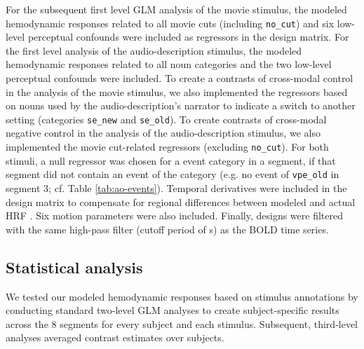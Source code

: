 \documentclass[english]{article}
\begin{document}
For the subsequent first level GLM analysis of the movie stimulus, the modeled
hemodynamic responses related to all movie cuts (including \texttt{no\_cut}) and
six low-level perceptual confounds were included as regressors in the design
matrix.
For the first level analysis of the audio-description stimulus, the modeled
hemodynamic responses related to all noun categories and the two low-level
perceptual confounds were included.
To create a contrasts of cross-modal control in the analysis of the movie
stimulus, we also implemented the regressors based on nouns used by the
audio-description's narrator to indicate a switch to another setting (categories
\texttt{se\_new} and \texttt{se\_old}).
To create contrasts of cross-modal negative control in the analysis of the
audio-description stimulus, we also implemented the movie cut-related regressors
(excluding \texttt{no\_cut}).
For both stimuli, a null regressor was chosen for a event category in a segment,
if that segment did not contain an event of the category (e.g. no event of
\texttt{vpe\_old} in segment 3; cf. Table \ref{tab:ao-events}).
Temporal derivatives were included in the design matrix to compensate for
regional differences between modeled and actual HRF \citep{friston1998event}.
Six motion parameters were also included.
Finally, designs were filtered with the same high-pass filter (cutoff period of
\unit[150]{s}) as the BOLD time series.


\subsection{Statistical analysis}

We tested our modeled hemodynamic responses based on stimulus annotations by
conducting standard two-level GLM analyses to create
subject-specific results across the 8 segments for every subject and each
stimulus.
Subsequent, third-level analyses averaged contrast estimates over subjects.
\end{document}

